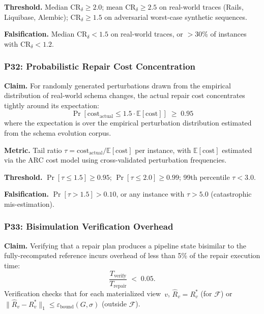 \documentclass[11pt,a4paper]{article}
\theoremstyle{definition}
\newcommand{\cost}{\mathrm{cost}}
\newcommand{\FragF}{\mathcal{F}}
\newcommand{\ebound}{\varepsilon_{\mathrm{bound}}}
\begin{document}
\textbf{Threshold.}  Median $\mathrm{CR}_\delta \geq 2.0$; mean
$\mathrm{CR}_\delta \geq 2.5$ on real-world traces (Rails, Liquibase, Alembic);
$\mathrm{CR}_\delta \geq 1.5$ on adversarial worst-case synthetic sequences.

\textbf{Falsification.}  Median $\mathrm{CR}_\delta < 1.5$ on real-world
traces, or $>$30\% of instances with $\mathrm{CR}_\delta < 1.2$.

\subsubsection{P32: Probabilistic Repair Cost Concentration}
\label{sec:p32}

\textbf{Claim.}
For randomly generated perturbations drawn from the empirical distribution of
real-world schema changes, the actual repair cost concentrates tightly around
its expectation:
\[
  \Pr\!\left[\cost_{\mathrm{actual}} \leq 1.5 \cdot
    \mathbb{E}[\cost]\right] \;\geq\; 0.95
\]
where the expectation is over the empirical perturbation distribution
estimated from the schema evolution corpus.

\textbf{Metric.}  Tail ratio
$\tau = \cost_{\mathrm{actual}} / \mathbb{E}[\cost]$ per instance,
with $\mathbb{E}[\cost]$ estimated via the ARC cost model using
cross-validated perturbation frequencies.

\textbf{Threshold.}  $\Pr[\tau \leq 1.5] \geq 0.95$;
$\Pr[\tau \leq 2.0] \geq 0.99$; 99th percentile $\tau < 3.0$.

\textbf{Falsification.}  $\Pr[\tau > 1.5] > 0.10$, or any instance with
$\tau > 5.0$ (catastrophic mis-estimation).

\subsubsection{P33: Bisimulation Verification Overhead}
\label{sec:p33}

\textbf{Claim.}
Verifying that a repair plan produces a pipeline state bisimilar to the
fully-recomputed reference incurs overhead of less than 5\% of the repair
execution time:
\[
  \frac{T_{\mathrm{verify}}}{T_{\mathrm{repair}}} \;<\; 0.05.
\]
Verification checks that for each materialized view~$v$,
$\hat{R}_v = R_v^*$ (for $\FragF$) or
$\|\hat{R}_v - R_v^*\|_1 \leq \ebound(G, \sigma)$ (outside $\FragF$).
\end{document}
